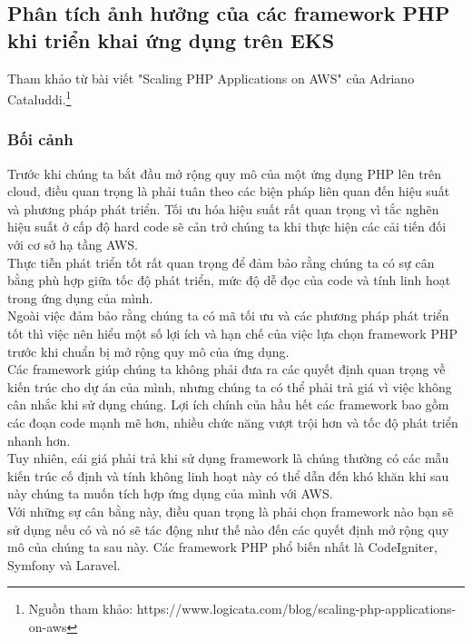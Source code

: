 \subsection{Phân tích ảnh hưởng của các framework PHP khi triển khai ứng dụng trên EKS}
\noindent Tham khảo từ bài viết "Scaling PHP Applications on AWS" của Adriano Cataluddi.\protect\footnote{Nguồn tham khảo: https://www.logicata.com/blog/scaling-php-applications-on-aws}
\subsubsection{Bối cảnh}
\noindent Trước khi chúng ta bắt đầu mở rộng quy mô của một ứng dụng PHP lên trên cloud, điều quan trọng là phải tuân theo các biện pháp liên quan đến hiệu suất và phương pháp phát triển. Tối ưu hóa hiệu suất rất quan trọng vì tắc nghẽn hiệu suất ở cấp độ hard code sẽ cản trở chúng ta khi thực hiện các cải tiến đối với cơ sở hạ tầng AWS.\\[0.5cm]
    Thực tiễn phát triển tốt rất quan trọng để đảm bảo rằng chúng ta có sự cân bằng phù hợp giữa tốc độ phát triển, mức độ dễ đọc của code và tính linh hoạt trong ứng dụng của mình.\\[0.5cm]
    Ngoài việc đảm bảo rằng chúng ta có mã tối ưu và các phương pháp phát triển tốt thì việc nên hiểu một số lợi ích và hạn chế của việc lựa chọn framework PHP trước khi chuẩn bị mở rộng quy mô của ứng dụng.\\[0.5cm]
    Các framework giúp chúng ta không phải đưa ra các quyết định quan trọng về kiến trúc cho dự án của mình, nhưng chúng ta có thể phải trả giá vì việc không cân nhắc khi sử dụng chúng. Lợi ích chính của hầu hết các framework bao gồm các đoạn code mạnh mẽ hơn, nhiều chức năng vượt trội hơn và tốc độ phát triển nhanh hơn.\\[0.5cm]
    Tuy nhiên, cái giá phải trả khi sử dụng framework là chúng thường có các mẫu kiến trúc cố định và tính không linh hoạt này có thể dẫn đến khó khăn khi sau này chúng ta muốn tích hợp ứng dụng của mình với AWS.\\[0.5cm]
    Với những sự cân bằng này, điều quan trọng là phải chọn framework nào bạn sẽ sử dụng nếu có và nó sẽ tác động như thế nào đến các quyết định mở rộng quy mô của chúng ta sau này. Các framework PHP phổ biến nhất là CodeIgniter, Symfony và Laravel.
